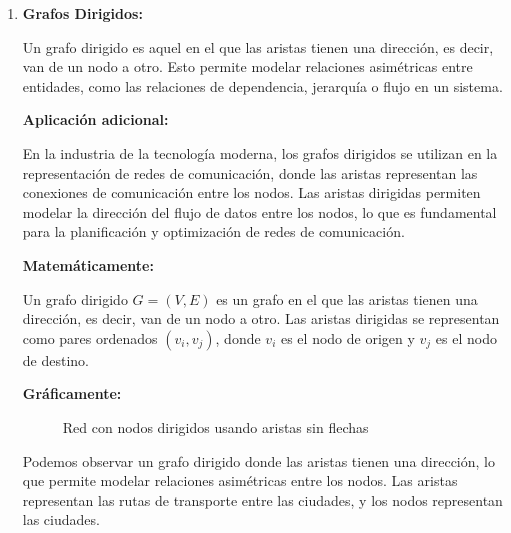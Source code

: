 \documentclass[11pt, a4paper]{article}
\begin{document}
\begin{enumerate}
  \item \textbf{Grafos Dirigidos:}
  
  Un grafo dirigido es aquel en el que las aristas tienen una dirección, es decir, van de un nodo a otro. Esto permite modelar relaciones asimétricas entre entidades, como las relaciones de dependencia, jerarquía o flujo en un sistema.
  
  \textbf{Aplicación adicional:}

  En la industria de la tecnología moderna, los grafos dirigidos se utilizan en la representación de redes de comunicación, donde las aristas representan las conexiones de comunicación entre los nodos. Las aristas dirigidas permiten modelar la dirección del flujo de datos entre los nodos, lo que es fundamental para la planificación y optimización de redes de comunicación.

  \textbf{Matemáticamente:}

  Un grafo dirigido $G = (V, E)$ es un grafo en el que las aristas tienen una dirección, es decir, van de un nodo a otro. Las aristas dirigidas se representan como pares ordenados $(v_i, v_j)$, donde $v_i$ es el nodo de origen y $v_j$ es el nodo de destino.

  \textbf{Gráficamente:}

  \begin{figure}[H]
    \centering
    \caption{Red con nodos dirigidos usando aristas sin flechas}
    \label{fig:rblue-relaciones}
\end{figure}

Podemos observar un grafo dirigido donde las aristas tienen una dirección, lo que permite modelar relaciones asimétricas entre los nodos. Las aristas representan las rutas de transporte entre las ciudades, y los nodos representan las ciudades.


\end{enumerate}
\end{document}
